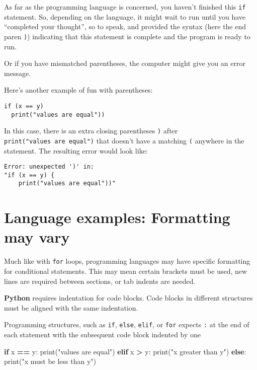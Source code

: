 \documentclass[
]{book}
\newenvironment{Shaded}{\begin{snugshade}}{\end{snugshade}}
\newcommand{\BuiltInTok}[1]{#1}
\newcommand{\ControlFlowTok}[1]{\textcolor[rgb]{0.13,0.29,0.53}{\textbf{#1}}}
\newcommand{\NormalTok}[1]{#1}
\newcommand{\OperatorTok}[1]{\textcolor[rgb]{0.81,0.36,0.00}{\textbf{#1}}}
\newcommand{\StringTok}[1]{\textcolor[rgb]{0.31,0.60,0.02}{#1}}
\begin{document}
As far as the programming language is concerned, you haven't finished this \texttt{if} statement. So, depending on the language, it might wait to run until you have ``completed your thought'', so to speak, and provided the syntax (here the end paren \texttt{)}) indicating that this statement is complete and the program is ready to run.

Or if you have mismatched parentheses, the computer might give you an error message.

Here's another example of fun with parentheses:

\begin{verbatim}
if (x == y) 
  print("values are equal"))
\end{verbatim}

In this case, there is an extra closing parentheses \texttt{)} after \texttt{print("values\ are\ equal")} that doesn't have a matching \texttt{(} anywhere in the statement. The resulting error would look like:

\begin{verbatim}
Error: unexpected ')' in:
"if (x == y) {
    print("values are equal"))"
\end{verbatim}

\section{Language examples: Formatting may vary}\label{language-examples-formatting-may-vary-1}

Much like with \texttt{for} loops, programming languages may have specific formatting for conditional statements. This may mean certain brackets must be used, new lines are required between sections, or tab indents are needed.

\textbf{Python} requires indentation for code blocks. Code blocks in different structures must be aligned with the same indentation.

Programming structures, such as \texttt{if}, \texttt{else}, \texttt{elif}, or \texttt{for} expects \texttt{:} at the end of each statement with the subsequent code block indented by one

\begin{Shaded}
\begin{Highlighting}[]
\ControlFlowTok{if}\NormalTok{ x }\OperatorTok{==}\NormalTok{ y:}
  \BuiltInTok{print}\NormalTok{(}\StringTok{"values are equal"}\NormalTok{)}
\ControlFlowTok{elif}\NormalTok{ x }\OperatorTok{\textgreater{}}\NormalTok{ y:}
  \BuiltInTok{print}\NormalTok{(}\StringTok{"x greater than y"}\NormalTok{)}
\ControlFlowTok{else}\NormalTok{:}
  \BuiltInTok{print}\NormalTok{(}\StringTok{"x must be less than y"}\NormalTok{)}
\end{Highlighting}
\end{Shaded}
\end{document}

